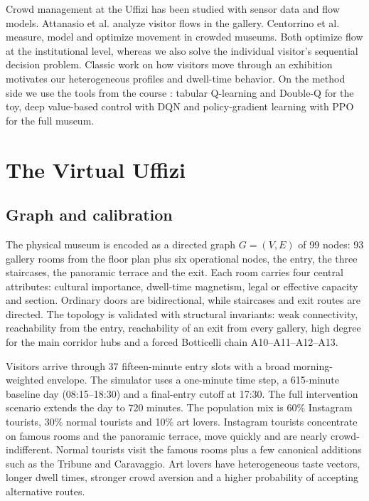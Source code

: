 \documentclass[11pt]{article}
\begin{document}
Crowd management at the Uffizi has been studied with sensor data and flow models. Attanasio et al.
\cite{attanasio2022} analyze visitor flows in the gallery. Centorrino et al. \cite{centorrino2021}
measure, model and optimize movement in crowded museums. Both optimize flow at the institutional level,
whereas we also solve the individual visitor's sequential decision problem. Classic work on how
visitors move through an exhibition \cite{veron1983} motivates our heterogeneous profiles and
dwell-time behavior. On the method side we use the tools from the course \cite{sutton2018}: tabular
Q-learning and Double-Q for the toy, deep value-based control with DQN \cite{mnih2015} and
policy-gradient learning with PPO \cite{schulman2017} for the full museum.

\section{The Virtual Uffizi}

\subsection{Graph and calibration}

The physical museum is encoded as a directed graph $G=(V,E)$ of 99 nodes: 93 gallery rooms from the
floor plan plus six operational nodes, the entry, the three staircases, the panoramic terrace and the
exit. Each room carries
four central attributes: cultural importance, dwell-time magnetism, legal or effective capacity and
section. Ordinary doors are bidirectional, while staircases and exit routes are directed. The topology is
validated with structural invariants: weak connectivity, reachability from the entry, reachability of
an exit from every gallery, high degree for the main corridor hubs and a forced Botticelli chain
A10--A11--A12--A13.

Visitors arrive through 37 fifteen-minute entry slots with a broad morning-weighted envelope. The
simulator uses a one-minute time step, a 615-minute baseline day (08:15--18:30) and a final-entry
cutoff at 17:30. The full intervention scenario extends the day to 720 minutes. The population mix is
60\% Instagram tourists, 30\% normal tourists and 10\% art lovers. Instagram tourists concentrate on
famous rooms and the panoramic terrace, move quickly and are nearly crowd-indifferent. Normal tourists
visit the famous rooms plus a few canonical additions such as the Tribune and Caravaggio. Art lovers
have heterogeneous taste vectors, longer dwell times, stronger crowd aversion and a higher probability
of accepting alternative routes.
\end{document}
